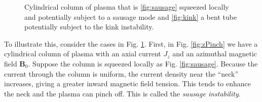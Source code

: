 	\begin{figure}
		\centering
		\caption{Cylindrical column of plasma that is \ref{fig:sausage} squeezed locally and potentially subject to a sausage mode and \ref{fig:kink} a bent tube potentially subject to the kink instability.}
		\label{fig:mhd_instabilities}
	\end{figure}

	To illustrate this, consider the cases in Fig. \ref{fig:mhd_instabilities}. First, in Fig. \ref{fig:zPinch} we have a cylindrical column of plasma with an axial current $J_z$ and an azimuthal magnetic field $\mathbf{B}_0$. Suppose the column is squeezed locally as Fig. \ref{fig:sausage}. Because the current through the column is uniform, the current density near the ``neck'' increases, giving a greater inward magnetic field tension. This tends to enhance the neck and the plasma can pinch off. This is called the \textit{sausage instability}.

